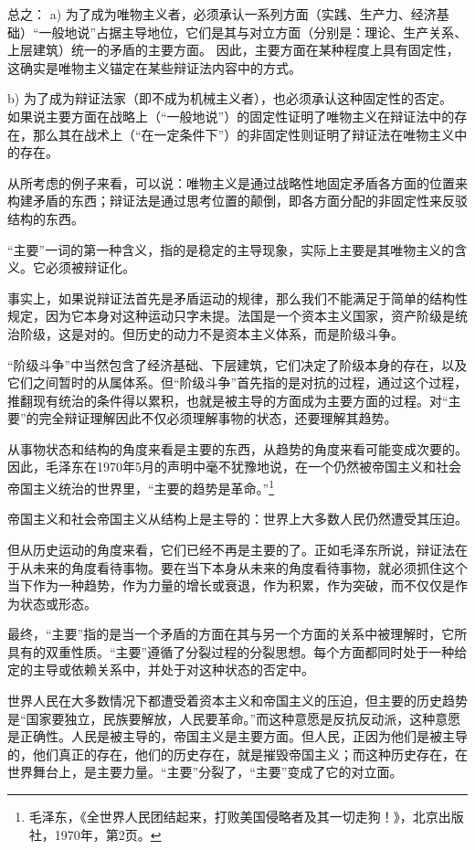 \documentclass[fontset=fandol, a4paper, 12pt, twoside]{ctexart}
\begin{document}
总之：
a) 为了成为唯物主义者，必须承认一系列方面（实践、生产力、经济基础）“一般地说”占据主导地位，它们是其与对立方面（分别是：理论、生产关系、上层建筑）统一的矛盾的主要方面。
因此，主要方面在某种程度上具有固定性，这确实是唯物主义锚定在某些辩证法内容中的方式。

b) 为了成为辩证法家（即不成为机械主义者），也必须承认这种固定性的否定。
如果说主要方面在战略上（“一般地说”）的固定性证明了唯物主义在辩证法中的存在，那么其在战术上（“在一定条件下”）的非固定性则证明了辩证法在唯物主义中的存在。

从所考虑的例子来看，可以说：唯物主义是通过战略性地固定矛盾各方面的位置来构建矛盾的东西；辩证法是通过思考位置的颠倒，即各方面分配的非固定性来反驳结构的东西。

“主要”一词的第一种含义，指的是稳定的主导现象，实际上主要是其唯物主义的含义。它必须被辩证化。

事实上，如果说辩证法首先是矛盾运动的规律，那么我们不能满足于简单的结构性规定，因为它本身对这种运动只字未提。法国是一个资本主义国家，资产阶级是统治阶级，这是对的。但历史的动力不是资本主义体系，而是阶级斗争。

“阶级斗争”中当然包含了经济基础、下层建筑，它们决定了阶级本身的存在，以及它们之间暂时的从属体系。但“阶级斗争”首先指的是对抗的过程，通过这个过程，推翻现有统治的条件得以累积，也就是被主导的方面成为主要方面的过程。对“主要”的完全辩证理解因此不仅必须理解事物的状态，还要理解其趋势。

从事物状态和结构的角度来看是主要的东西，从趋势的角度来看可能变成次要的。因此，毛泽东在1970年5月的声明中毫不犹豫地说，在一个仍然被帝国主义和社会帝国主义统治的世界里，“主要的趋势是革命。”\footnote{毛泽东，《全世界人民团结起来，打败美国侵略者及其一切走狗！》，北京出版社，1970年，第2页。}

帝国主义和社会帝国主义从结构上是主导的：世界上大多数人民仍然遭受其压迫。

但从历史运动的角度来看，它们已经不再是主要的了。正如毛泽东所说，辩证法在于从未来的角度看待事物。要在当下本身从未来的角度看待事物，就必须抓住这个当下作为一种趋势，作为力量的增长或衰退，作为积累，作为突破，而不仅仅是作为状态或形态。

最终，“主要”指的是当一个矛盾的方面在其与另一个方面的关系中被理解时，它所具有的双重性质。“主要”遵循了分裂过程的分裂思想。每个方面都同时处于一种给定的主导或依赖关系中，并处于对这种状态的否定中。

世界人民在大多数情况下都遭受着资本主义和帝国主义的压迫，但主要的历史趋势是“国家要独立，民族要解放，人民要革命。”而这种意愿是反抗反动派，这种意愿是正确性。人民是被主导的，帝国主义是主要方面。但人民，正因为他们是被主导的，他们真正的存在，他们的历史存在，就是摧毁帝国主义；而这种历史存在，在世界舞台上，是主要力量。“主要”分裂了，“主要”变成了它的对立面。
\end{document}
